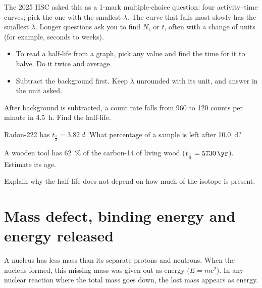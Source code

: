 \begin{examtip}
The 2025 HSC asked this as a 1-mark multiple-choice question: four activity--time
curves; pick the one with the smallest $\lambda$. The curve that falls most slowly
has the smallest $\lambda$. Longer questions ask you to find $N_\mathrm{t}$ or $t$,
often with a change of units (for example, seconds to weeks).
\begin{itemize}
  \item To read a half-life from a graph, pick any value and find the time for it to
        halve. Do it twice and average.
  \item Subtract the background first. Keep $\lambda$ unrounded with its unit, and
        answer in the unit asked.
\end{itemize}
\end{examtip}
\enlargethispage{\baselineskip}

\begin{quickcheck}
  \item After background is subtracted, a count rate falls from 960 to 120 counts
        per minute in \qty{4.5}{h}. Find the half-life.
  \item Radon-222 has $t_{\frac{1}{2}} = \qty{3.82}{d}$. What percentage of a sample is
        left after \qty{10.0}{d}?
  \item A wooden tool has \qty{62}{\percent} of the carbon-14 of living wood
        ($t_{\frac{1}{2}} = \qty{5730}{\yr}$). Estimate its age.
  \item Explain why the half-life does not depend on how much of the isotope is present.
\end{quickcheck}

\section{Mass defect, binding energy and energy released}\label{ch4:sec:binding}

\begin{bigidea}
A nucleus has less mass than its separate protons and neutrons. When the nucleus
formed, this missing mass was given out as energy ($E = mc^2$). In any nuclear
reaction where the total mass goes down, the lost mass appears as energy.
\end{bigidea}


